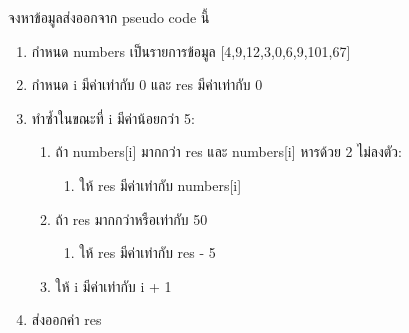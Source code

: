 \question จงหาข้อมูลส่งออกจาก pseudo code นี้
\begin{pseudocode}
    \begin{enumerate}
        \item กำหนด numbers เป็นรายการข้อมูล [4,9,12,3,0,6,9,101,67]
        \item กำหนด i มีค่าเท่ากับ 0 และ res มีค่าเท่ากับ 0
        \item ทำซ้ำในขณะที่ i มีค่าน้อยกว่า 5:
        \begin{enumerate}
            \item ถ้า numbers[i] มากกว่า res และ numbers[i] หารด้วย 2 ไม่ลงตัว:
            \begin{enumerate}
                \item ให้ res มีค่าเท่ากับ numbers[i]
            \end{enumerate}
            \item ถ้า res มากกว่าหรือเท่ากับ 50
            \begin{enumerate}
                \item ให้ res มีค่าเท่ากับ res - 5
            \end{enumerate}
            \item ให้ i มีค่าเท่ากับ i + 1
        \end{enumerate}
        \item ส่งออกค่า res
    \end{enumerate}
\end{pseudocode}

